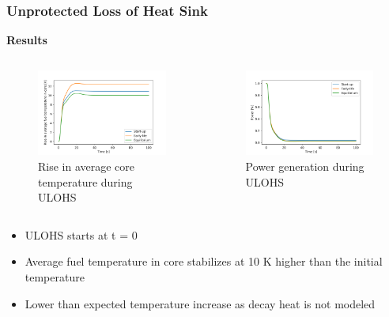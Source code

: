 \begin{frame}
	\frametitle{Unprotected Loss of Heat Sink}
		\textbf{Results}
		\begin{columns}
			\column{5cm}
			\begin{figure}
				\centering
				\includegraphics[width=\textwidth]{../paper/figures/loscatemp}
				\caption{Rise in average core temperature during \gls{ULOHS}}
			\end{figure}
			\column{5cm}
			\begin{figure}
				\centering
				\includegraphics[width=\textwidth]{../paper/figures/loscaheat}
				\caption{Power generation during \gls{ULOHS}}
			\end{figure}
		\end{columns}
		\begin{itemize}
			\item \gls{ULOHS} starts at t = 0
			\item Average fuel temperature in core stabilizes at 10 K higher than
			the initial temperature
			\item Lower than expected temperature increase as decay heat is not
			modeled
		\end{itemize}
\end{frame}
